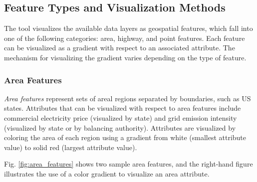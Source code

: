 \subsection{Feature Types and Visualization Methods}

The tool visualizes the available data layers as geospatial features, which fall into one of the following categories: area, highway, and point features. Each feature can be visualized as a gradient with respect to an associated attribute. The mechanism for visualizing the gradient varies depending on the type of feature.

\subsubsection{Area Features}
\textit{Area features} represent sets of areal regions separated by boundaries, such as US states. Attributes that can be visualized with respect to area features include commercial electricity price (visualized by state) and grid emission intensity (visualized by state or by balancing authority). Attributes are visualized by coloring the area of each region using a gradient from white (smallest attribute value) to solid red (largest attribute value). 

Fig. \ref{fig:area_features} shows two sample area features, and the right-hand figure illustrates the use of a color gradient to visualize an area attribute. 

